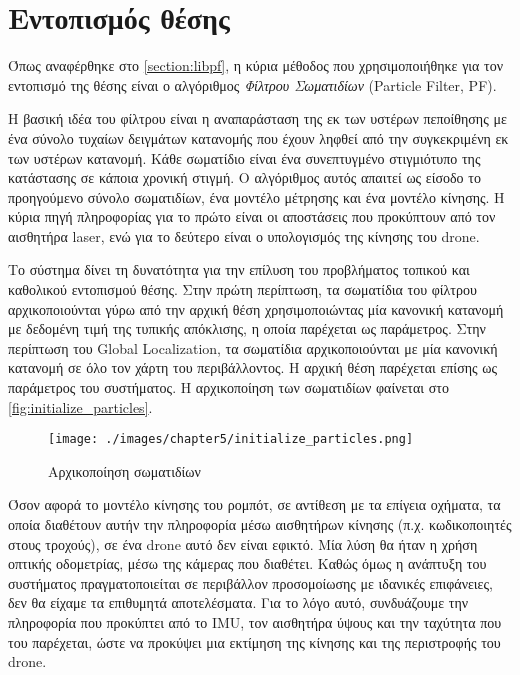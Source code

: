 \section{Εντοπισμός θέσης}
\label{section:localization_impl}

Όπως αναφέρθηκε στο \autoref{section:libpf}, η κύρια μέθοδος που χρησιμοποιήθηκε για τον εντοπισμό της θέσης είναι ο αλγόριθμος \emph{Φίλτρου Σωματιδίων} (Particle Filter, PF). 

Η βασική ιδέα του φίλτρου είναι η αναπαράσταση της εκ των υστέρων πεποίθησης με ένα σύνολο τυχαίων δειγμάτων κατανομής που έχουν ληφθεί από την συγκεκριμένη εκ των υστέρων κατανομή. Κάθε σωματίδιο είναι ένα συνεπτυγμένο στιγμιότυπο της κατάστασης σε κάποια χρονική στιγμή. Ο αλγόριθμος αυτός απαιτεί ως είσοδο το προηγούμενο σύνολο σωματιδίων, ένα μοντέλο μέτρησης και ένα μοντέλο κίνησης. Η κύρια πηγή πληροφορίας για το πρώτο είναι οι αποστάσεις που προκύπτουν από τον αισθητήρα laser, ενώ για το δεύτερο είναι ο υπολογισμός της κίνησης του drone.

Το σύστημα δίνει τη δυνατότητα για την επίλυση του προβλήματος τοπικού και καθολικού εντοπισμού θέσης. Στην πρώτη περίπτωση, τα σωματίδια του φίλτρου αρχικοποιούνται γύρω από την αρχική θέση χρησιμοποιώντας μία κανονική κατανομή με δεδομένη τιμή της τυπικής απόκλισης, η οποία παρέχεται ως παράμετρος. Στην περίπτωση του Global Localization, τα σωματίδια αρχικοποιούνται με μία κανονική κατανομή σε όλο τον χάρτη του περιβάλλοντος. Η αρχική θέση παρέχεται επίσης ως παράμετρος του συστήματος. Η αρχικοποίηση των σωματιδίων φαίνεται στο \autoref{fig:initialize_particles}.

\begin{figure}[!ht]
    \centering
    \texttt{[image: ./images/chapter5/initialize\_particles.png]}
    \caption{Αρχικοποίηση σωματιδίων}
    \label{fig:initialize_particles}
\end{figure} 

Όσον αφορά το μοντέλο κίνησης του ρομπότ, σε αντίθεση με τα επίγεια οχήματα, τα οποία διαθέτουν αυτήν την πληροφορία μέσω αισθητήρων κίνησης (π.χ. κωδικοποιητές στους τροχούς), σε ένα drone αυτό δεν είναι εφικτό. Μία λύση θα ήταν η χρήση οπτικής οδομετρίας, μέσω της κάμερας που διαθέτει. Καθώς όμως η ανάπτυξη του συστήματος πραγματοποιείται σε περιβάλλον προσομοίωσης με ιδανικές επιφάνειες, δεν θα είχαμε τα επιθυμητά αποτελέσματα. Για το λόγο αυτό, συνδυάζουμε την πληροφορία που προκύπτει από το IMU, τον αισθητήρα ύψους και την ταχύτητα που του παρέχεται, ώστε να προκύψει μια εκτίμηση της κίνησης και της περιστροφής του drone. 


